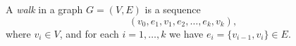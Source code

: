 

\setcounter{section}{1}
\setcounter{subsection}{5}
\setcounter{dfn}{14}

\begin{dfn}
A \emph{walk} in a graph $G = (V, E)$ is a sequence
\[
(v_0, e_1, v_1, e_2, \ldots, e_k, v_k),
\]
where $v_i \in V$, and for each $i = 1, \ldots, k$ we have $e_i = \{v_{i-1}, v_i\} \in E$.
\end{dfn}

